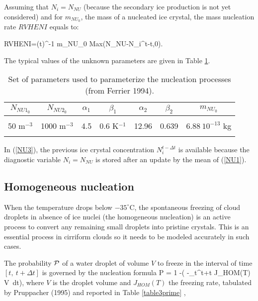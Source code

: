 Assuming that $N_i=N_{NU}$ (because the secondary ice production is not yet
considered) and for $m_{NU_0}$, the mass of a nucleated ice crystal, the mass
nucleation rate $RVHENI$ equals to:

%
\be\label{NU3}
RVHENI=(\rho \Delta t)^{-1} m_{NU_0} Max(N_{NU}-N_i^{t-\Delta t},0).
\ee
%

The typical values of the unknown parameters are given in Table \ref{table3}.

\begin{table}
\caption{Set of parameters used to parameterize the nucleation processes (from Ferrier 1994).}
\begin{center}\label{table3}
\begin{tabular}{|c|c|c|c|c|c|c|}
\hline
$N_{NU1_0}$ & $N_{NU2_0}$ & $\alpha_1$ & $\beta_1$& $\alpha_2$ & $\beta_2$ & $m_{NU_0}$  \\
\hline \hline
 & & & & & & \\
50 m$^{-3}$ & 1000 m$^{-3}$ & 4.5 & 0.6 K$^{-1}$ & 12.96 & 0.639 & $6.88\ 10^{-13}$ kg \\
 & & & & & & \\
\hline
\end{tabular}
\end{center}
\end{table}

In (\ref{NU3}), the previous ice crystal concentration $N_i^{t-\Delta t}$ is
available because the diagnostic variable $N_i=N_{NU}$ is stored after an
update by the mean of (\ref{NU1}).

%
\subsection{Homogeneous nucleation}
%
When the temperature drops below $-35^\circ$C, the spontaneous freezing of cloud
droplets in absence of ice nuclei (the homogeneous nucleation) is an active
process to convert any remaining small droplets into pristine crystals. This is
an essential process in cirriform clouds so it needs to be modeled accurately in
such cases.

The probability ${\cal P}$ of a water droplet of volume $V$ to freeze in the
interval of time $[t,\ t+\Delta t]$ is governed by the nucleation formula
%
\be\label{HOM1}
{\cal P} = 1 -\exp\Big( -\int_{t}^{t+\Delta t} J_{HOM}(T) V\ dt\Big),
\ee
%
\noindent where $V$ is the droplet volume and $J_{HOM}(T)$ the freezing rate,
tabulated by Pruppacher (1995) and reported in Table \ref{table3prime}\footnotemark
%
,

